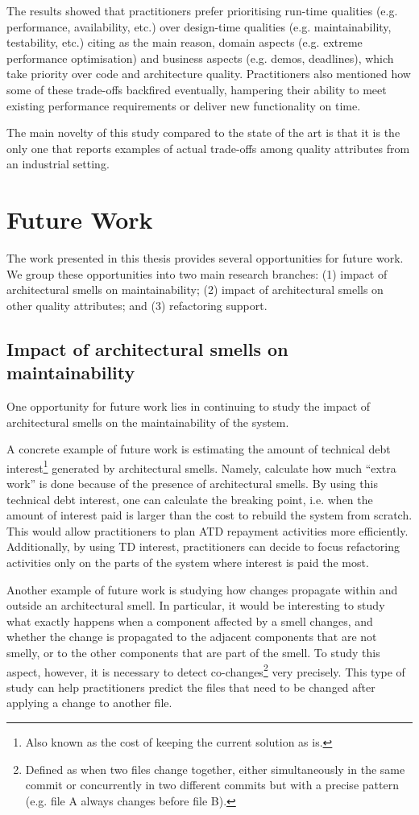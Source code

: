 The results showed that practitioners prefer prioritising run-time qualities (e.g. performance, availability, etc.) over design-time qualities (e.g. maintainability, testability, etc.) citing as the main reason, domain aspects (e.g. extreme performance optimisation) and business aspects (e.g. demos, deadlines), which take priority over code and architecture quality.
Practitioners also mentioned how some of these trade-offs backfired eventually, hampering their ability to meet existing performance requirements or deliver new functionality on time. 

The main novelty of this study compared to the state of the art is that it is the only one that reports examples of actual trade-offs among quality attributes from an industrial setting.

\section{Future Work}\label{c8:sec:future-work}
The work presented in this thesis provides several opportunities for future work.
We group these opportunities into two main research branches:
(1) impact of architectural smells on maintainability; (2) impact of architectural smells on other quality attributes; and (3) refactoring support.


\subsection{Impact of architectural smells on maintainability}
One opportunity for future work lies in continuing to study the impact of architectural smells on the maintainability of the system.

A concrete example of future work is estimating the amount of technical debt interest\footnote{Also known as the cost of keeping the current solution as is.} generated by architectural smells.
Namely, calculate how much ``extra work'' is done because of the presence of architectural smells.
By using this technical debt interest, one can calculate the breaking point, i.e. when the amount of interest paid is larger than the cost to rebuild the system from scratch.
This would allow practitioners to plan ATD repayment activities more efficiently.
Additionally, by using TD interest, practitioners can decide to focus refactoring activities only on the parts of the system where interest is paid the most.

Another example of future work is studying how changes propagate within and outside an architectural smell.
In particular, it would be interesting to study what exactly happens when a component affected by a smell changes, and whether the change is propagated to the adjacent components that are not smelly, or to the other components that are part of the smell.
To study this aspect, however, it is necessary to detect co-changes\footnote{Defined as when two files change together, either simultaneously in the same commit or concurrently in two different commits but with a precise pattern (e.g. file A always changes before file B).} very precisely.
This type of study can help practitioners predict the files that need to be changed after applying a change to another file.


